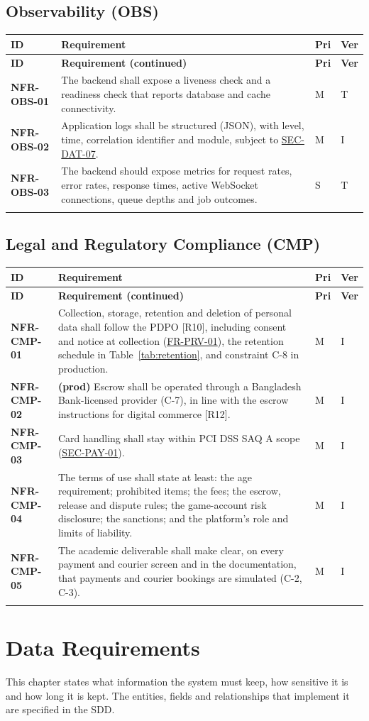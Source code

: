 \documentclass[11pt,a4paper]{report}
\makeatletter
\newenvironment{reqs}{%
  \small
  \begin{longtable}{@{}>{\raggedright\arraybackslash}p{2.35cm}
                       >{\raggedright\arraybackslash}p{10.3cm}
                       >{\centering\arraybackslash}p{0.7cm}
                       >{\centering\arraybackslash}p{0.7cm}@{}}
  \toprule
  \textbf{ID} & \textbf{Requirement} & \textbf{Pri} & \textbf{Ver} \\
  \midrule
  \endfirsthead
  \toprule
  \textbf{ID} & \textbf{Requirement (continued)} & \textbf{Pri} & \textbf{Ver} \\
  \midrule
  \endhead
  \bottomrule
  \endfoot
}{\end{longtable}}
\newcommand{\req}[5]{\leavevmode\textbf{#1}\hypertarget{#1}{} & #5 & #2 & #3 \\ \addlinespace[2pt]}
\newcommand{\rr}[1]{\hyperlink{#1}{#1}}
\makeatother
\begin{document}
\section{Observability (OBS)}
\begin{reqs}
\req{NFR-OBS-01}{M}{T}{new}{The backend shall expose a liveness check and a readiness check that reports database and cache connectivity.}
\req{NFR-OBS-02}{M}{I}{new}{Application logs shall be structured (JSON), with level, time, correlation identifier and module, subject to \rr{SEC-DAT-07}.}
\req{NFR-OBS-03}{S}{T}{new}{The backend should expose metrics for request rates, error rates, response times, active WebSocket connections, queue depths and job outcomes.}
\end{reqs}

\section{Legal and Regulatory Compliance (CMP)}
\begin{reqs}
\req{NFR-CMP-01}{M}{I}{NFR-17}{Collection, storage, retention and deletion of personal data shall follow the PDPO [R10], including consent and notice at collection (\rr{FR-PRV-01}), the retention schedule in Table~\ref{tab:retention}, and constraint C-8 in production.}
\req{NFR-CMP-02}{M}{I}{C-7}{\textbf{(prod)} Escrow shall be operated through a Bangladesh Bank-licensed provider (C-7), in line with the escrow instructions for digital commerce [R12].}
\req{NFR-CMP-03}{M}{I}{new}{Card handling shall stay within PCI DSS SAQ A scope (\rr{SEC-PAY-01}).}
\req{NFR-CMP-04}{M}{I}{new}{The terms of use shall state at least: the age requirement; prohibited items; the fees; the escrow, release and dispute rules; the game-account risk disclosure; the sanctions; and the platform's role and limits of liability.}
\req{NFR-CMP-05}{M}{I}{new}{The academic deliverable shall make clear, on every payment and courier screen and in the documentation, that payments and courier bookings are simulated (C-2, C-3).}
\end{reqs}

\chapter{Data Requirements}
\label{ch:data}
This chapter states what information the system must keep, how sensitive it is and how long it is kept. The entities, fields and relationships that implement it are specified in the SDD.
\end{document}
